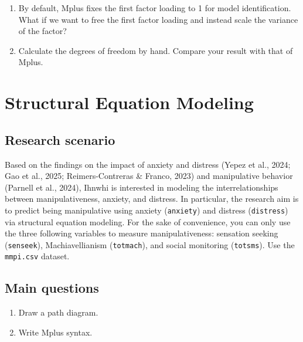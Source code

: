\documentclass[
]{book}
\begin{document}
\begin{enumerate}
\def\labelenumi{\arabic{enumi}.}
\item
  By default, Mplus fixes the first factor loading to 1 for model identification. What if we want to free the first factor loading and instead scale the variance of the factor?
\item
  Calculate the degrees of freedom by hand. Compare your result with that of Mplus.
\end{enumerate}

\chapter{Structural Equation Modeling}\label{structural-equation-modeling}

\section{Research scenario}\label{research-scenario-2}

Based on the findings on the impact of anxiety and distress (Yepez et al., 2024; Gao et al., 2025; Reimers-Contreras \& Franco, 2023) and manipulative behavior (Parnell et al., 2024), Ihnwhi is interested in modeling the interrelationships between manipulativeness, anxiety, and distress. In particular, the research aim is to predict being manipulative using anxiety (\texttt{anxiety}) and distress (\texttt{distress}) via structural equation modeling. For the sake of convenience, you can only use the three following variables to measure manipulativeness: sensation seeking (\texttt{senseek}), Machiavellianism (\texttt{totmach}), and social monitoring (\texttt{totsms}). Use the \texttt{mmpi.csv} dataset.

\section{Main questions}\label{main-questions-2}

\begin{enumerate}
\def\labelenumi{\arabic{enumi}.}
\item
  Draw a path diagram.
\item
  Write Mplus syntax.
\end{enumerate}
\end{document}

